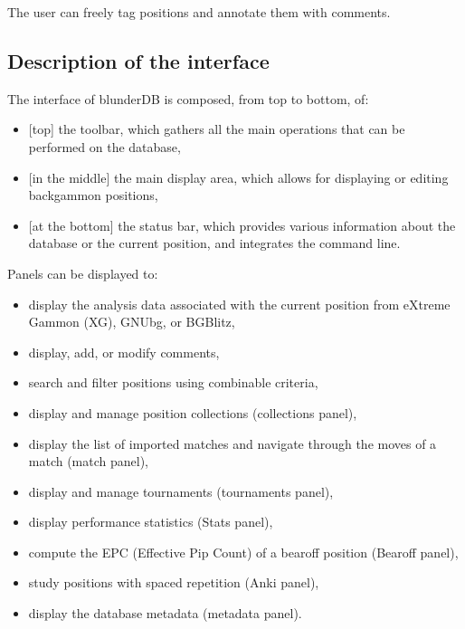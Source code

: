 \documentclass[letterpaper,10pt,english]{sphinxmanual}
\begin{document}
\sphinxAtStartPar
The user can freely tag positions and annotate them with comments.


\subsection{Description of the interface}
\label{\detokenize{manuel:description-de-l-interface}}
\sphinxAtStartPar
The interface of blunderDB is composed, from top to bottom, of:
\begin{itemize}
\item {} 
\sphinxAtStartPar
{[}top{]} the toolbar, which gathers all the main operations that can be performed on the database,

\item {} 
\sphinxAtStartPar
{[}in the middle{]} the main display area, which allows for displaying or editing backgammon positions,

\item {} 
\sphinxAtStartPar
{[}at the bottom{]} the status bar, which provides various information about the database or the current position, and integrates the command line.

\end{itemize}

\sphinxAtStartPar
Panels can be displayed to:
\begin{itemize}
\item {} 
\sphinxAtStartPar
display the analysis data associated with the current position from eXtreme Gammon (XG), GNUbg, or BGBlitz,

\item {} 
\sphinxAtStartPar
display, add, or modify comments,

\item {} 
\sphinxAtStartPar
search and filter positions using combinable criteria,

\item {} 
\sphinxAtStartPar
display and manage position collections (collections panel),

\item {} 
\sphinxAtStartPar
display the list of imported matches and navigate through the moves of a match (match panel),

\item {} 
\sphinxAtStartPar
display and manage tournaments (tournaments panel),

\item {} 
\sphinxAtStartPar
display performance statistics (Stats panel),

\item {} 
\sphinxAtStartPar
compute the EPC (Effective Pip Count) of a bearoff position (Bearoff panel),

\item {} 
\sphinxAtStartPar
study positions with spaced repetition (Anki panel),

\item {} 
\sphinxAtStartPar
display the database metadata (metadata panel).

\end{itemize}
\end{document}
